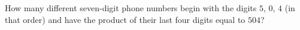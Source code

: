 How many different seven-digit phone numbers begin with the digits $5$, $0$, $4$ (in that order) and have the product of their last four digits equal to $504$?

